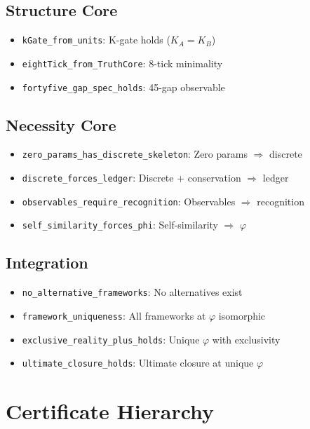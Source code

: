 \documentclass[11pt]{article}
\theoremstyle{definition}
\theoremstyle{remark}
\begin{document}
\subsection{Structure Core}
\begin{itemize}
\item \texttt{kGate\_from\_units}: K-gate holds ($K_A = K_B$)
\item \texttt{eightTick\_from\_TruthCore}: 8-tick minimality
\item \texttt{fortyfive\_gap\_spec\_holds}: 45-gap observable
\end{itemize}

\subsection{Necessity Core}
\begin{itemize}
\item \texttt{zero\_params\_has\_discrete\_skeleton}: Zero params $\Rightarrow$ discrete
\item \texttt{discrete\_forces\_ledger}: Discrete + conservation $\Rightarrow$ ledger
\item \texttt{observables\_require\_recognition}: Observables $\Rightarrow$ recognition
\item \texttt{self\_similarity\_forces\_phi}: Self-similarity $\Rightarrow$ $\varphi$
\end{itemize}

\subsection{Integration}
\begin{itemize}
\item \texttt{no\_alternative\_frameworks}: No alternatives exist
\item \texttt{framework\_uniqueness}: All frameworks at $\varphi$ isomorphic
\item \texttt{exclusive\_reality\_plus\_holds}: Unique $\varphi$ with exclusivity
\item \texttt{ultimate\_closure\_holds}: Ultimate closure at unique $\varphi$
\end{itemize}

\section{Certificate Hierarchy}
\end{document}

